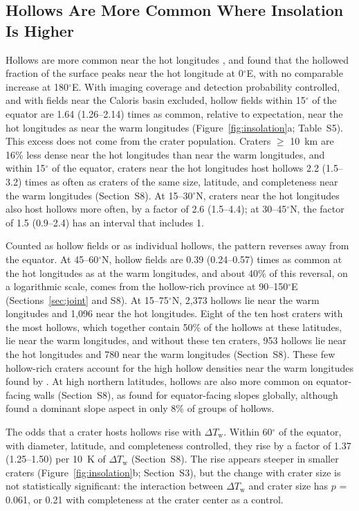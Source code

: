 \documentclass[article,review]{planetary}
\begin{document}
\subsection{Hollows Are More Common Where Insolation Is Higher}
\label{sec:sun}
Hollows are more common near the hot longitudes \parencite{detoffoli2024}, and \textcite{thomas2014} found that the hollowed fraction of the surface peaks near the hot longitude at 0$^\circ$E, with no comparable increase at 180$^\circ$E. With imaging coverage and detection probability controlled, and with fields near the Caloris basin excluded, hollow fields within 15$^\circ$ of the equator are 1.64 (1.26--2.14) times as common, relative to expectation, near the hot longitudes as near the warm longitudes (Figure~\ref{fig:insolation}a; Table~S5). This excess does not come from the crater population. Craters $\geq$ 10~km are 16\% less dense near the hot longitudes than near the warm longitudes, and within 15$^\circ$ of the equator, craters near the hot longitudes host hollows 2.2 (1.5--3.2) times as often as craters of the same size, latitude, and completeness near the warm longitudes (Section~S8). At 15--30$^\circ$N, craters near the hot longitudes also host hollows more often, by a factor of 2.6 (1.5--4.4); at 30--45$^\circ$N, the factor of 1.5 (0.9--2.4) has an interval that includes 1.

Counted as hollow fields or as individual hollows, the pattern reverses away from the equator. At 45--60$^\circ$N, hollow fields are 0.39 (0.24--0.57) times as common at the hot longitudes as at the warm longitudes, and about 40\% of this reversal, on a logarithmic scale, comes from the hollow-rich province at 90--150$^\circ$E (Sections~\ref{sec:joint} and S8). At 15--75$^\circ$N, 2,373 hollows lie near the warm longitudes and 1,096 near the hot longitudes. Eight of the ten host craters with the most hollows, which together contain 50\% of the hollows at these latitudes, lie near the warm longitudes, and without these ten craters, 953 hollows lie near the hot longitudes and 780 near the warm longitudes (Section~S8). These few hollow-rich craters account for the high hollow densities near the warm longitudes found by \textcite{bickel2025}. At high northern latitudes, hollows are also more common on equator-facing walls (Section~S8), as \textcite{bickel2025} found for equator-facing slopes globally, although \textcite{thomas2014} found a dominant slope aspect in only 8\% of groups of hollows.

The odds that a crater hosts hollows rise with $\Delta T_\mathrm{w}$. Within 60$^\circ$ of the equator, with diameter, latitude, and completeness controlled, they rise by a factor of 1.37 (1.25--1.50) per 10~K of $\Delta T_\mathrm{w}$ (Section~S8). The rise appears steeper in smaller craters (Figure~\ref{fig:insolation}b; Section~S3), but the change with crater size is not statistically significant: the interaction between $\Delta T_\mathrm{w}$ and crater size has $p$ = 0.061, or 0.21 with completeness at the crater center as a control.
\end{document}
